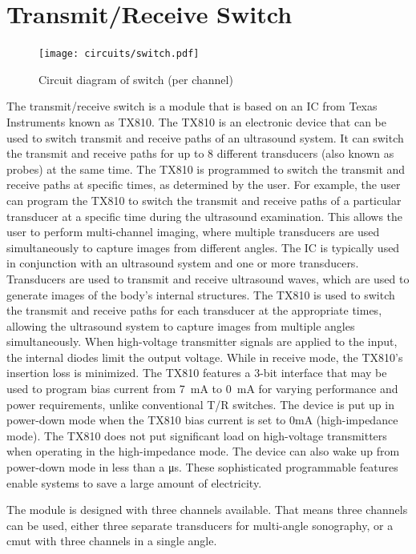 \section{Transmit/Receive Switch}
\begin{figure}[htbp]
	\centering
	\texttt{[image: circuits/switch.pdf]}
	\label{fig:3_switch}
	\caption{Circuit diagram of switch (per channel)}
\end{figure}
The transmit/receive switch is a module that is based on an IC from Texas Instruments known as TX810\cite{TX810}. The TX810 is an electronic device that can be used to switch transmit and receive paths of an ultrasound system. It can switch the transmit and receive paths for up to 8 different transducers (also known as probes) at the same time. The TX810 is programmed to switch the transmit and receive paths at specific times, as determined by the user. For example, the user can program the TX810 to switch the transmit and receive paths of a particular transducer at a specific time during the ultrasound examination. This allows the user to perform multi-channel imaging, where multiple transducers are used simultaneously to capture images from different angles. The IC is typically used in conjunction with an ultrasound system and one or more transducers. Transducers are used to transmit and receive ultrasound waves, which are used to generate images of the body's internal structures. The TX810 is used to switch the transmit and receive paths for each transducer at the appropriate times, allowing the ultrasound system to capture images from multiple angles simultaneously. When high-voltage transmitter signals are applied to the input, the internal diodes limit the output voltage. While in receive mode, the TX810's insertion loss is minimized. The TX810 features a 3-bit interface that may be used to program bias current from \qty{7}{\milli\ampere} to \qty{0}{\milli\ampere} for varying performance and power requirements, unlike conventional T/R switches. The device is put up in power-down mode when the TX810 bias current is set to 0mA (high-impedance mode). The TX810 does not put significant load on high-voltage transmitters when operating in the high-impedance mode. The device can also wake up from power-down mode in less than a \unit{\micro\second}. These sophisticated programmable features enable systems to save a large amount of electricity.

The module is designed with three channels available. That means three channels can be used, either three separate transducers for multi-angle sonography, or a \gls{cmut} with three channels in a single angle.

